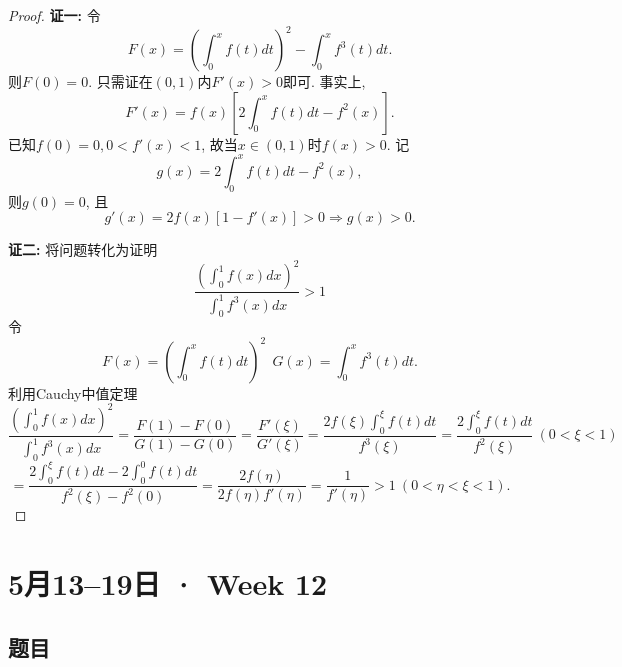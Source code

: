 \documentclass[UTF8,11pt, a4paper, oneside, fontset=none]{ctexbook}
\begin{document}
\begin{enumerate}
\begin{proof}
\noindent
{\bf 证一:} 令
\[
F(x) = \left( \int_0^x f(t) dt \right)^2 - \int_0^x f^3(t) dt.
\]
则$F(0) = 0$. 只需证在$(0, 1)$内$F'(x) > 0$即可. 事实上, 
\[
F'(x) = f(x) \left[ 2 \int_0^x f(t) dt - f^2(x) \right].
\]
已知$f(0) = 0, 0 < f'(x) < 1$, 故当$x \in (0, 1)$时$f(x) > 0$. 记
\[
g(x) = 2 \int_0^x f(t) dt - f^2(x),
\]
则$g(0) = 0$, 且
\[
g'(x) = 2 f(x) [1 - f'(x)] > 0 \Rightarrow g(x) > 0.
\]


\noindent
{\bf 证二:} 将问题转化为证明
\[
\frac{\left( \int_0^1 f(x) dx \right)^2}{ \int_0^1 f^3(x) dx } > 1
\]
令
\[
F(x) = \left( \int_0^x f(t) dt \right)^2 \ \ G(x) =  \int_0^x f^3(t) dt. 
\]
利用Cauchy中值定理
\[
\frac{\left( \int_0^1 f(x) dx \right)^2}{ \int_0^1 f^3(x) dx }  = \frac{F(1) - F(0)}{G(1) - G(0)} = \frac{F'(\xi)}{G'(\xi)} = \frac{2f(\xi) \int_0^{\xi} f(t) dt}{f^3(\xi)} = \frac{2 \int_0^{\xi} f(t) dt}{f^2(\xi)} \ (0 < \xi < 1)
\]
\[
=  \frac{2 \int_0^{\xi} f(t) dt - 2 \int_0^0 f(t)dt}{f^2(\xi) - f^2(0)} = \frac{2f(\eta)}{2f(\eta)f'(\eta)} = \frac{1}{f'(\eta)} > 1 \ (0 < \eta < \xi < 1).
\]

\end{proof}


\end{enumerate}

\clearpage

\section{5月13--19日 · Week 12}

\subsection*{题目}
\end{document}
